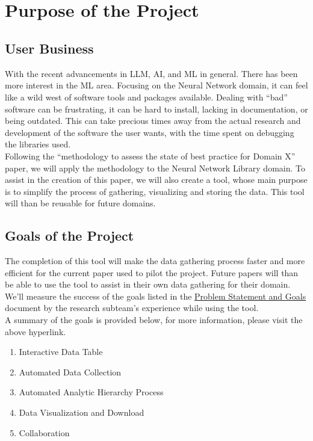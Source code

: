 \documentclass[12pt]{article}
\begin{document}
~\newpage

\tableofcontents

~\newpage
\section{Purpose of the Project}
\subsection{User Business}
With the recent advancements in LLM, AI, and ML in general. There has been more interest in the ML area. Focusing on the Neural Network domain, it can feel like a wild west of software tools and packages available. Dealing with “bad” software can be frustrating, it can be hard to install, lacking in documentation, or being outdated. 
This can take precious times away from the actual research and development of the software the user wants, with the time spent on debugging the libraries used.
\\Following the “methodology to assess the state of best practice for Domain X” paper, we will apply the methodology to the Neural Network Library domain. 
To assist in the creation of this paper, we will also create a tool, whose main purpose is to simplify the process of gathering, visualizing and storing the data. This tool will than be reusable for future domains. 
\subsection{Goals of the Project}
The completion of this tool will make the data gathering process faster and more efficient for the current paper used to pilot the project. Future papers will than be able to use the tool to assist in their own data gathering for their domain.\\
We'll measure the success of the goals listed in the \href{https://github.com/thaafei/DomainX/blob/main/docs/ProblemStatementAndGoals/ProblemStatement.pdf}{Problem Statement and Goals} document by the research subteam's experience while using the tool. \\
A summary of the goals is provided below, for more information, please visit the above hyperlink.
\begin{enumerate}
  \item Interactive Data Table
  \item Automated Data Collection
  \item Automated Analytic Hierarchy Process
  \item Data Visualization and Download
  \item Collaboration
\end{enumerate}
\end{document}

